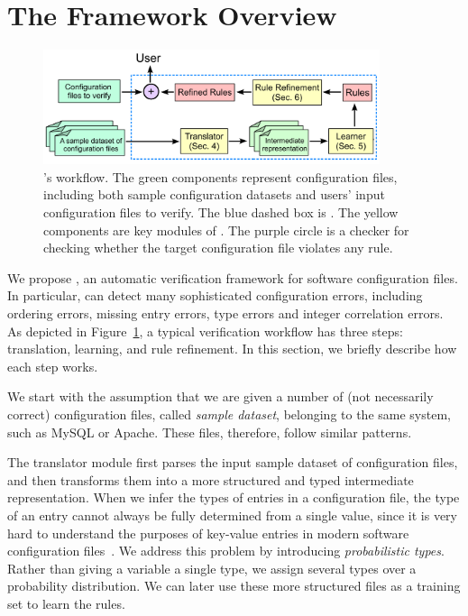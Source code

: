 
\section{The \app Framework Overview}

\begin{figure}[tbp] \centering
\includegraphics[width=0.88\textwidth]{figs/overview}
\caption{\app's workflow. The green components represent configuration 
  files, including both sample configuration datasets and users' input
  configuration files to verify.
  The blue dashed box is \app. 
  The yellow components are key modules of \app.
  The purple circle is a checker for checking whether the target
  configuration file violates any rule.}
\label{fig-overview}
\end{figure}

We propose \app, an automatic verification framework for 
software configuration files.
In particular, \app can detect many sophisticated configuration errors, 
including ordering errors, missing entry errors,
type errors and integer correlation errors. 
As depicted in Figure~\ref{fig-overview}, 
a typical \app verification workflow has three steps:
translation, learning, and rule refinement. In this section, we briefly
describe how each step works.

We start with the assumption 
that we are given a number of (not necessarily correct) 
configuration files, called {\em sample dataset}, 
belonging to the same system, such as MySQL or Apache. 
These files, therefore, follow similar patterns.

The translator module first parses the input sample 
dataset of configuration files, and then transforms them into 
a more structured and typed intermediate representation.
When we infer the types of entries in a configuration file, 
the type of an entry cannot always be fully determined from 
a single value, since it is very hard to understand
the purposes of key-value entries in modern
software configuration files~\cite{xu15hey}.
We address this problem 
by introducing {\em probabilistic types}.
Rather than giving a variable a single type, 
we assign several types over a probability distribution. 
We can later use these more structured files
as a training set to learn the rules. 

